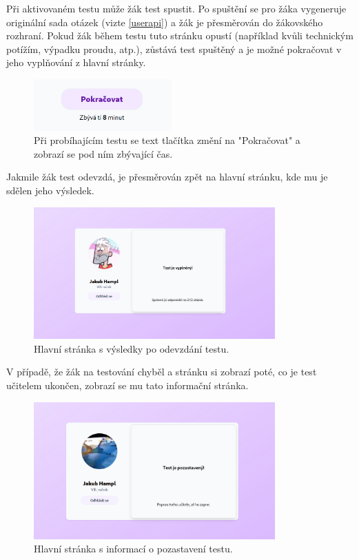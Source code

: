 Při aktivovaném testu může žák test spustit. Po spuštění se pro žáka vygeneruje originální sada otázek (vizte \ref{userapi}) a žák je přesměrován do žákovského rozhraní. Pokud žák během testu tuto stránku opustí (například kvůli technickým potížím, výpadku proudu, atp.), zůstává test spuštěný a je možné pokračovat v jeho vyplňování z hlavní stránky. 

\begin{figure}[H]
    \centering
    \includegraphics[width=200px]{images/01design/continue.png}
    \caption{Při probíhajícím testu se text tlačítka změní na "Pokračovat" a zobrazí se pod ním zbývající čas.}
\end{figure}

Jakmile žák test odevzdá, je přesměrován zpět na hlavní stránku, kde mu je sdělen jeho výsledek.

\begin{figure}[H]
    \centering
    \includegraphics[width=350px]{images/01design/filled-out.png}
    \caption{Hlavní stránka s výsledky po odevzdání testu.}
\end{figure}

V případě, že žák na testování chyběl a stránku si zobrazí poté, co je test učitelem ukončen, zobrazí se mu tato informační stránka.

\begin{figure}[H]
    \centering
    \includegraphics[width=350px]{images/01design/pending.png}
    \caption{Hlavní stránka s informací o pozastavení testu.}
\end{figure}

